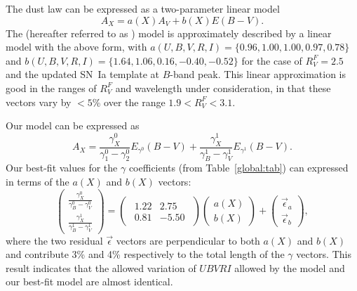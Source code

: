 \documentclass{aastex61}   	%
\begin{document}
The \citet{1989ApJ...345..245C} dust law can be expressed as a two-parameter linear model
\begin{equation}
A_X = a(X)  A_V + b(X) E(B-V).
\end{equation}
The \citet{1999PASP..111...63F} (hereafter referred to as ) model is approximately described by a linear model with
the above form, with
$a(U,B,V,R,I)=\{0.96,   1.00,   1.00,   0.97,   0.78\}$ and $b(U,B,V,R,I)=\{  1.64,   1.06,   0.16,  -0.40,  -0.52\}$ for the case of
$R^F_V=2.5$ and the updated
\citet{2007ApJ...663.1187H} SN~Ia template at $B$-band peak.  This linear approximation
is good in the ranges of $R^F_V$ and wavelength under consideration, in that these vectors vary by $<5$\% over the range $1.9<R^F_V<3.1$.

Our model can be expressed as
\begin{equation}
A_X = \frac{\gamma^0_X}{\gamma^0_1-\gamma^0_2}  E_{\gamma^0}(B-V) +  \frac{\gamma^1_X}{\gamma^1_B-\gamma^1_V}  E_{\gamma^1}(B-V).
\end{equation}
Our best-fit values for the $\gamma$ coefficients (from Table~\ref{global:tab}) can expressed in terms of the $a(X)$ and $b(X)$ vectors:
\begin{equation}
\begin{pmatrix}
 \frac{\gamma^0_X}{\gamma^0_B-\gamma^0_V} \\
\frac{\gamma^1_X}{\gamma^1_B-\gamma^1_V} 
\end{pmatrix}=
\begin{pmatrix}
\begin{array}{rr}
1.22 & 2.75 \\
0.81 & -5.50
\end{array}
\end{pmatrix} 
\begin{pmatrix}
a(X) \\
b(X)
\end{pmatrix}+
\begin{pmatrix}
\vec{\epsilon}_a \\
\vec{\epsilon}_b
\end{pmatrix},
\end{equation}
where the two residual $\vec{\epsilon}$ vectors are perpendicular to both $a(X)$ and $b(X)$ and
contribute  3\% and 4\% respectively to the total  length of the $\gamma$ vectors.
This result indicates that
the allowed variation of $UBVRI$ allowed by the  model and our best-fit model are almost identical.
\end{document}
